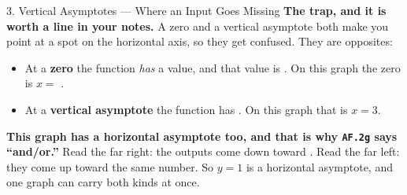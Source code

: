 \documentclass[10pt]{article}
\begin{document}
\begin{notesbox}{3. Vertical Asymptotes --- Where an Input Goes Missing}
\vspace{4pt}
\textbf{The trap, and it is worth a line in your notes.} A zero and a vertical asymptote both make
you point at a spot on the horizontal axis, so they get confused. They are opposites:
\begin{itemize}[leftmargin=1.3em, itemsep=2pt, topsep=3pt]
  \item At a \textbf{zero} the function \emph{has} a value, and that value is . On this
        graph the zero is $x=$ .
  \item At a \textbf{vertical asymptote} the function has . On this graph that is
        $x=3$.
\end{itemize}

\vspace{4pt}
\textbf{This graph has a horizontal asymptote too, and that is why \texttt{AF.2g} says ``and/or.''}
Read the far right: the outputs come down toward . Read the far left: they come up
toward the same number. So $y=1$ is a horizontal asymptote, and one graph can carry both kinds at
once.
\end{notesbox}

\vspace{0.10in}
\end{document}
